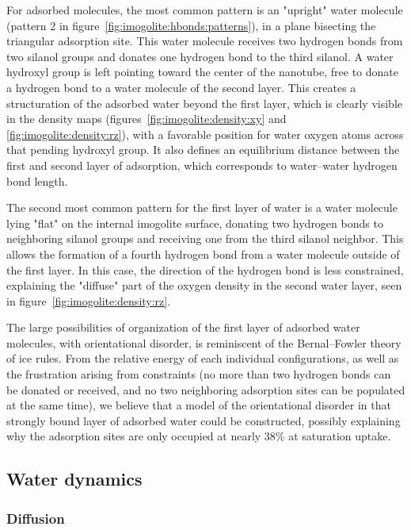 \documentclass[thesis]{subfiles}
\begin{document}
For adsorbed molecules, the most common pattern is an "upright" water molecule
(pattern 2 in figure~\ref{fig:imogolite:hbonds:patterns}), in a plane bisecting
the triangular adsorption site. This water molecule receives two hydrogen bonds
from two silanol groups and donates one hydrogen bond to the third silanol. A
water hydroxyl group is left pointing toward the center of the nanotube, free to
donate a hydrogen bond to a water molecule of the second layer. This creates a
structuration of the adsorbed water beyond the first layer, which is clearly
visible in the density maps (figures~\ref{fig:imogolite:density:xy} and
\ref{fig:imogolite:density:rz}), with a favorable position for water oxygen
atoms across that pending hydroxyl group. It also defines an equilibrium
distance between the first and second layer of adsorption, which corresponds to
water--water hydrogen bond length.

The second most common pattern for the first layer of water is a water molecule
lying "flat" on the internal imogolite surface, donating two hydrogen bonds to
neighboring silanol groups and receiving one from the third silanol neighbor.
This allows the formation of a fourth hydrogen bond from a water molecule
outside of the first layer. In this case, the direction of the hydrogen bond is
less constrained, explaining the "diffuse" part of the oxygen density in the
second water layer, seen in figure~\ref{fig:imogolite:density:rz}.

The large possibilities of organization of the first layer of adsorbed water
molecules, with orientational disorder, is reminiscent of the Bernal--Fowler
theory of ice rules\cite{Bernal1933}. From the relative energy of each
individual configurations, as well as the frustration arising from constraints
(no more than two hydrogen bonds can be donated or received, and no two neighboring
adsorption sites can be populated at the same time), we believe that a model of
the orientational disorder in that strongly bound layer of adsorbed water could
be constructed, possibly explaining why the adsorption sites are only occupied
at nearly 38\% at saturation uptake.

\subsection{Water dynamics}

\subsubsection{Diffusion}
\end{document}
